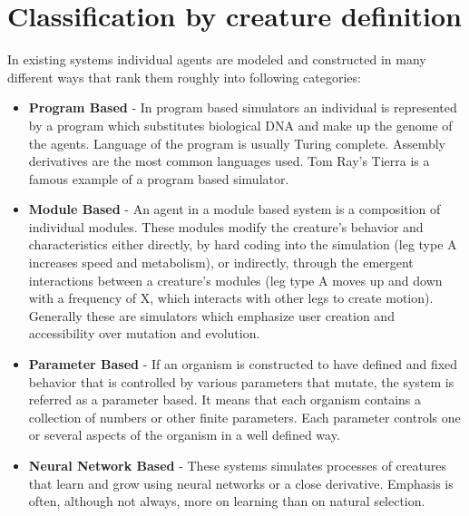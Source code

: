 \documentclass[a4paper,12pt]{report}
\begin{document}
\section{Classification by creature definition}
In existing systems individual agents are modeled and constructed in many different ways that rank them roughly into following categories:
\begin{itemize}
    \item \textbf{Program Based} - In program based simulators an individual is represented by a program which substitutes biological DNA and make up the genome of the agents. Language of the program is usually Turing complete. Assembly derivatives are the most common languages used. Tom Ray's Tierra is a famous example of a program based simulator.
    \item \textbf{Module Based} - An agent in a module based system is a composition of individual modules. These modules modify the creature's behavior and characteristics either directly, by hard coding into the simulation (leg type A increases speed and metabolism), or indirectly, through the emergent interactions between a creature's modules (leg type A moves up and down with a frequency of X, which interacts with other legs to create motion). Generally these are simulators which emphasize user creation and accessibility over mutation and evolution.  
    \item \textbf{Parameter Based} - If an organism is constructed to have defined and fixed behavior that is controlled by various parameters that mutate, the system is referred as a parameter based. It means that each organism contains a collection of numbers or other finite parameters. Each parameter controls one or several aspects of the organism in a well defined way.
    \item \textbf{Neural Network Based} - These systems simulates processes of  creatures that learn and grow using neural networks or a close derivative. Emphasis is often, although not always, more on learning than on natural selection.
\end{itemize}
\end{document}
